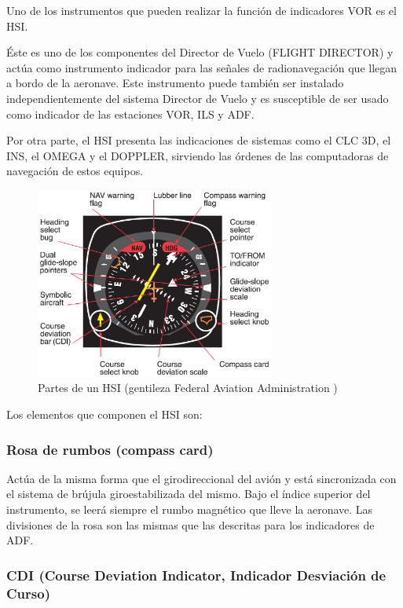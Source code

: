 Uno de los instrumentos que pueden realizar la función de indicadores VOR es el HSI.

\'Este es uno de los componentes del Director de Vuelo (FLIGHT DIRECTOR) y actúa como instrumento indicador para las señales de radionavegación que llegan a bordo de la aeronave. Este instrumento puede también ser instalado independientemente del sistema Director de Vuelo y es susceptible de ser usado como indicador de las estaciones VOR, ILS y ADF.

Por otra parte, el HSI presenta las indicaciones de sistemas como el CLC 3D, el INS, el OMEGA y el DOPPLER, sirviendo las órdenes de las computadoras de navegación de estos equipos.


\begin{figure}[!h]
  \centering
  \includegraphics[keepaspectratio,width=0.7\textwidth]{06.radionavegacion/Imagenes/06.02.vor.imagenes/Wiki-HSI.eps}
  \caption{Partes de un HSI (gentileza Federal Aviation Administration )}
  \label{fig:HSI-partes}
\end{figure}

Los elementos que componen el HSI son:

\subsubsection{Rosa de rumbos (compass card) }

Actúa de la misma forma que el girodireccional del avión y está sincronizada con el sistema de brújula giroestabilizada del mismo. Bajo el índice superior del instrumento, se leerá siempre el rumbo magnético que lleve la aeronave. Las divisiones de la rosa son las mismas que las descritas para los indicadores de ADF.

\subsubsection{CDI  (Course Deviation Indicator, Indicador Desviación de Curso)}

